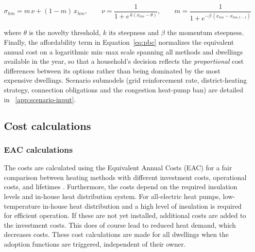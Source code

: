 \documentclass[preprint,12pt,authoryear]{elsarticle}
\begin{document}
\begin{equation}\label{eq:salience}
  \sigma_{hm} = m\,\nu + (1-m)\,x_{hm},\qquad
  \nu = \frac{1}{1+e^{\,k(x_{hm}-\theta)}},\qquad
  m = \frac{1}{1+e^{-\beta\,(x_{hm}-x_{hm,t-1})}}
\end{equation}

\noindent where $\theta$ is the novelty threshold, $k$ its steepness and
$\beta$ the momentum steepness. Finally, the affordability term in
Equation~\ref{eq:pbc} normalizes the equivalent annual cost on a logarithmic
min--max scale spanning all methods and dwellings available in the year, so
that a household's decision reflects the \emph{proportional} cost differences
between its options rather than being dominated by the most expensive
dwellings. Scenario submodels (grid reinforcement rate, district-heating
strategy, connection obligations and the congestion heat-pump ban) are
detailed in ~\ref{app:scenario-input}.

\subsection{Cost calculations}
\label{app:cost}

\subsubsection{EAC calculations}

The costs are calculated using the Equivalent Annual Costs (EAC) for a fair
comparison between heating methods with different investment costs,
operational costs, and lifetimes \citep{hastingsFinancialMethods2021}.
Furthermore, the costs depend on the required insulation levels and in-house
heat distribution system. For all-electric heat pumps, low-temperature
in-house heat distribution and a high level of insulation is required for
efficient operation. If these are not yet installed, additional costs are
added to the investment costs. This does of course lead to reduced heat
demand, which decreases costs. These cost calculations are made for all
dwellings when the adoption functions are triggered, independent of their
owner.
\end{document}
